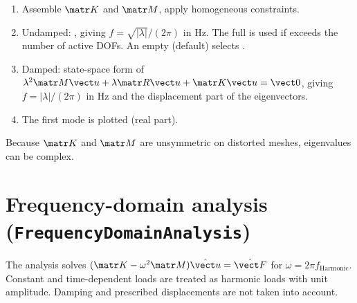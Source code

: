 \begin{enumerate}
  \item Assemble $\matr K$ and $\matr M$, apply homogeneous constraints.
  \item Undamped: , giving
    $f = \sqrt{|\lambda|}/(2\pi)$ in Hz. The full  is used if
     exceeds the number of active DOFs. An empty
     (default) selects .
  \item Damped: state-space form of
    $\lambda^2\matr M\vect u + \lambda\matr R\vect u + \matr K\vect u = \vect 0$,
    giving $f = |\lambda|/(2\pi)$ in Hz and the displacement part of the
    eigenvectors.
  \item The first mode is plotted (real part).
\end{enumerate}
Because $\matr K$ and $\matr M$ are unsymmetric on distorted meshes, eigenvalues
can be complex.

\section{Frequency-domain analysis (\texttt{FrequencyDomainAnalysis})}

The analysis solves $(\matr K - \omega^2\matr M)\hat{\vect u} = \hat{\vect F}$ for
$\omega = 2\pi f_\mathrm{Harmonic}$. Constant and time-dependent loads are treated
as harmonic loads with unit amplitude. Damping and prescribed displacements are
not taken into account.
